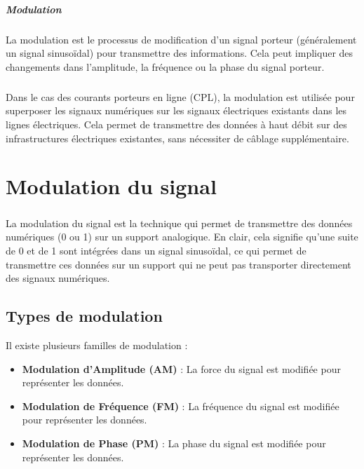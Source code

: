 \documentclass[a4paper,twocolumn]{report}
\begin{document}
\paragraph{Modulation} La modulation est le processus de modification d'un signal porteur (généralement un signal sinusoïdal) pour transmettre des informations. Cela peut impliquer des changements dans l'amplitude, la fréquence ou la phase du signal porteur.




\paragraph{}Dans le cas des courants porteurs en ligne (CPL), la modulation est utilisée pour superposer les signaux numériques sur les signaux électriques existants dans les lignes électriques. Cela permet de transmettre des données à haut débit sur des infrastructures électriques existantes, sans nécessiter de câblage supplémentaire.
\chapter{Modulation du signal}

\paragraph{}La modulation du signal est la technique qui permet de transmettre des données numériques (0 ou 1) sur un support analogique. En clair, cela signifie qu'une suite de 0 et de 1 sont intégrées dans un signal sinusoïdal, ce qui permet de transmettre ces données sur un support qui ne peut pas transporter directement des signaux numériques. 

\section{Types de modulation}
Il existe plusieurs familles de modulation :
\begin{itemize}
    \item \textbf{Modulation d'Amplitude (AM)} : La force du signal est modifiée pour représenter les données.
    \item \textbf{Modulation de Fréquence (FM)} : La fréquence du signal est modifiée pour représenter les données.
    \item \textbf{Modulation de Phase (PM)} : La phase du signal est modifiée pour représenter les données.
\end{itemize}
\end{document}
